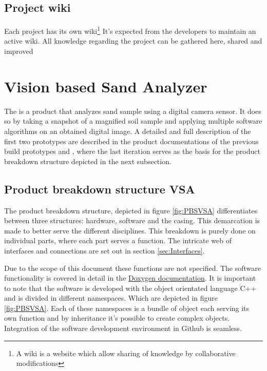 \documentclass[fleqn,10pt]{SelfArx} %
\begin{document}
\subsection{Project wiki}
Each project has its own wiki\footnote{A wiki is a website which allow sharing of knowledge by collaborative modifications} It's expected from the developers to maintain an active wiki. All knowledge regarding the project can be gathered here, shared and improved

\section{Vision based Sand Analyzer}\label{sec:Vision based Sand Analyzer}
The \vsa is a product that analyzes sand sample using a digital camera sensor. It does so by taking a snapshot of a magnified soil sample and applying multiple software algorithms on an obtained digital image. A detailed and full description of the first two prototypes are described in the product documentations of the previous build prototypes \cite{jelle_spijker_vision_2015} and \cite{spijker_product_2014}, where the last iteration serves as the basis for the product breakdown structure depicted in the next subsection.

\subsection{Product breakdown structure VSA}
The product breakdown structure, depicted in figure \ref{fig:PBSVSA} differentiates between three structures: hardware, software and the casing. This demarcation is made to better serve the different disciplines. This breakdown is purely done on individual parts, where each part serves a function. The intricate web of interfaces and connections are set out in section \ref{sec:Interfaces}.

Due to the scope of this document these functions are not specified. The software functionality is covered in detail in the \href{http://peer23peer.github.io/VisionSoilAnalyzer/Doxygen/html/index.html}{\color{color1}Doxygen documentation}. It is important to note that the software is developed with the object orientated language C++ and is divided in different namespaces. Which are depicted in figure \ref{fig:PBSVSA}. Each of these namespaces is a bundle of object each serving its own function and by inheritance it's possible to create complex objects. Integration of the software development environment in Github is seamless.
\end{document}
